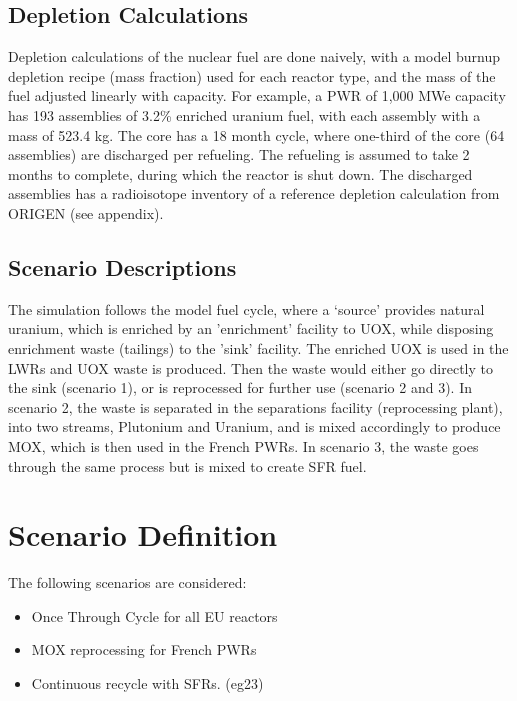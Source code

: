 \subsection{Depletion Calculations}
Depletion calculations of the nuclear fuel are done
naively, with a model burnup depletion recipe (mass fraction) used
for each reactor type, and the mass of the fuel 
adjusted linearly with capacity. For example, a PWR of
1,000 MWe capacity has 193 assemblies of 3.2\% enriched
uranium fuel, with each assembly with a mass of 523.4 kg.
The core has a 18 month cycle, where one-third of the 
core (64 assemblies) are discharged per refueling. The refueling
is assumed to take 2 months to complete, during which the reactor
is shut down. The discharged
assemblies has a radioisotope inventory of a reference
depletion calculation from ORIGEN (see appendix).


\subsection{Scenario Descriptions}
The simulation follows the model fuel cycle, where a `source'
provides natural uranium, which is enriched by an 'enrichment'
facility to \gls{UOX}, while disposing enrichment waste (tailings)
to the 'sink' facility. The enriched \gls{UOX} is used
in the \gls{LWR}s and \gls{UOX} waste is produced. Then the waste
would either go directly to the sink (scenario 1), or is reprocessed
for further use (scenario 2 and 3). In scenario 2, the waste is 
separated in the separations facility (reprocessing plant), into
two streams, Plutonium and Uranium, and is mixed accordingly to produce
\gls{MOX}, which is then used in the French PWRs. 
In scenario 3, the waste goes through the same process but is mixed
to create \gls{SFR} fuel.


\section{Scenario Definition}
The following scenarios are considered: 
\begin{itemize}
	\item Once Through Cycle for all EU reactors
	\item \gls{MOX} reprocessing for French \gls{PWR}s
	\item Continuous recycle with \gls{SFR}s. (eg23)\cite{wigeland_nuclear_2014}
\end{itemize}
